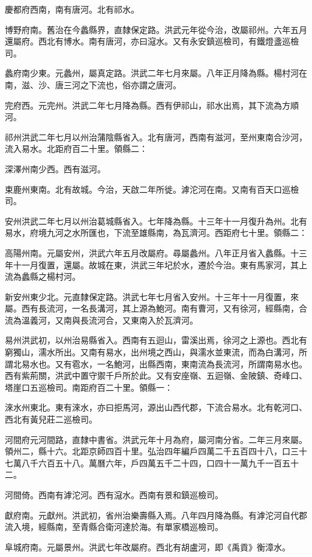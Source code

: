 慶都府西南，南有唐河。北有祁水。

博野府南。舊治在今蠡縣界，直隸保定路。洪武元年從今治，改屬祁州。六年五月還屬府。西北有博水。南有唐河，亦曰滱水。又有永安鎮巡檢司，有鐵燈盞巡檢司。

蠡府南少東。元蠡州，屬真定路。洪武二年七月來屬。八年正月降為縣。楊村河在南，滋、沙、唐三河之下流也，俗亦謂之唐河。

完府西。元完州。洪武二年七月降為縣。西有伊祁山，祁水出焉，其下流為方順河。

祁州洪武二年七月以州治蒲陰縣省入。北有唐河，西南有滋河，至州東南合沙河，流入易水。北距府百二十里。領縣二：

深澤州南少西。西有滋河。

束鹿州東南。北有故城。今治，天啟二年所徙。滹沱河在南。又南有百天口巡檢司。

安州洪武二年七月以州治葛城縣省入。七年降為縣。十三年十一月復升為州。北有易水，府境九河之水所匯也，下流至雄縣南，為瓦濟河。西距府七十里。領縣二：

高陽州南。元屬安州，洪武六年五月改屬府。尋屬蠡州。八年正月省入蠡縣。十三年十一月復置，還屬。故城在東，洪武三年圮於水，遷於今治。東有馬家河，其上流為蠡縣之楊村河。

新安州東少北。元直隸保定路。洪武七年七月省入安州。十三年十一月復置，來屬。西有長流河，一名長溝河，其上源為鮑河。南有曹河，又有徐河，經縣南，合流為溫義河，又南與長流河合，又東南入於瓦濟河。

易州洪武初，以州治易縣省入。西南有五迴山，雷溪出焉，徐河之上源也。西北有窮獨山，濡水所出。又南有易水，出州境之西山，與濡水並東流，而為白溝河，所謂北易水也。又有雹水，一名鮑河，出縣西南，東南流為長流河，所謂南易水也。西有紫荊關，洪武中置守禦千戶所於此。又有安座嶺、五迴嶺、金陂鎮、奇峰口、塔崖口五巡檢司。南距府百二十里。領縣一：

淶水州東北。東有淶水，亦曰拒馬河，源出山西代郡，下流合易水。北有乾河口、西北有黃兒莊二巡檢司。

河間府元河間路，直隸中書省。洪武元年十月為府，屬河南分省。二年三月來屬。領州二，縣十六。北距京師四百十里。弘治四年編戶四萬二千五百四十八，口三十七萬八千六百五十八。萬曆六年，戶四萬五千二十四，口四十一萬九千一百五十二。

河間倚。西南有滹沱河。西有滱水。西南有景和鎮巡檢司。

獻府南。元獻州。洪武初，省州治樂壽縣入焉。八年四月降為縣。有滹沱河自代郡流入境，經縣南，至青縣合衛河達於海。有單家橋巡檢司。

阜城府南。元屬景州。洪武七年改屬府。西北有胡盧河，即《禹貢》衡漳水。

